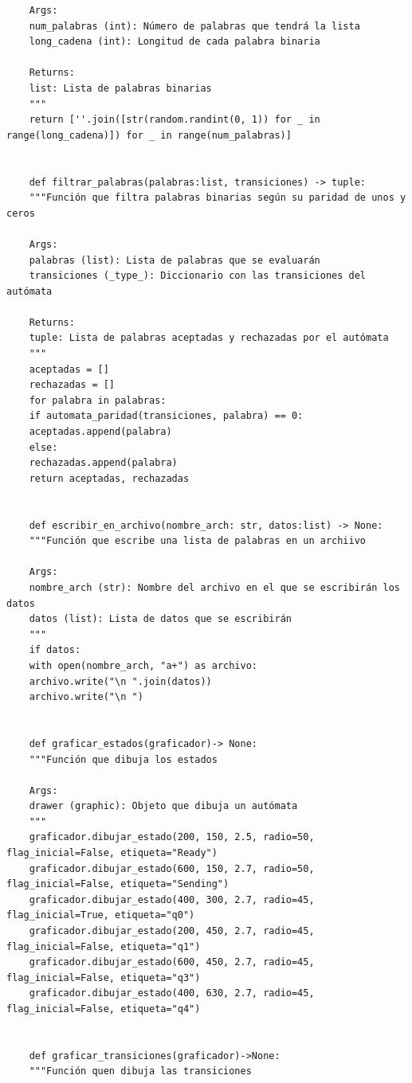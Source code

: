 \documentclass[11pt]{article} %
\begin{document}
\begin{lstlisting}
	Args:
	num_palabras (int): Número de palabras que tendrá la lista
	long_cadena (int): Longitud de cada palabra binaria
	
	Returns:
	list: Lista de palabras binarias
	"""
	return [''.join([str(random.randint(0, 1)) for _ in range(long_cadena)]) for _ in range(num_palabras)]
	
	
	def filtrar_palabras(palabras:list, transiciones) -> tuple:
	"""Función que filtra palabras binarias según su paridad de unos y ceros
	
	Args:
	palabras (list): Lista de palabras que se evaluarán
	transiciones (_type_): Diccionario con las transiciones del autómata
	
	Returns:
	tuple: Lista de palabras aceptadas y rechazadas por el autómata
	"""
	aceptadas = []
	rechazadas = []
	for palabra in palabras:
	if automata_paridad(transiciones, palabra) == 0:
	aceptadas.append(palabra)
	else:
	rechazadas.append(palabra)
	return aceptadas, rechazadas
	
	
	def escribir_en_archivo(nombre_arch: str, datos:list) -> None:
	"""Función que escribe una lista de palabras en un archiivo
	
	Args:
	nombre_arch (str): Nombre del archivo en el que se escribirán los datos
	datos (list): Lista de datos que se escribirán
	"""
	if datos:
	with open(nombre_arch, "a+") as archivo:
	archivo.write("\n ".join(datos))
	archivo.write("\n ")
	
	
	def graficar_estados(graficador)-> None:
	"""Función que dibuja los estados
	
	Args:
	drawer (graphic): Objeto que dibuja un autómata
	"""
	graficador.dibujar_estado(200, 150, 2.5, radio=50, flag_inicial=False, etiqueta="Ready")
	graficador.dibujar_estado(600, 150, 2.7, radio=50, flag_inicial=False, etiqueta="Sending")
	graficador.dibujar_estado(400, 300, 2.7, radio=45, flag_inicial=True, etiqueta="q0")
	graficador.dibujar_estado(200, 450, 2.7, radio=45, flag_inicial=False, etiqueta="q1")
	graficador.dibujar_estado(600, 450, 2.7, radio=45, flag_inicial=False, etiqueta="q3")
	graficador.dibujar_estado(400, 630, 2.7, radio=45, flag_inicial=False, etiqueta="q4")
	
	
	def graficar_transiciones(graficador)->None:
	"""Función quen dibuja las transiciones
	

\end{lstlisting}
\end{document}
